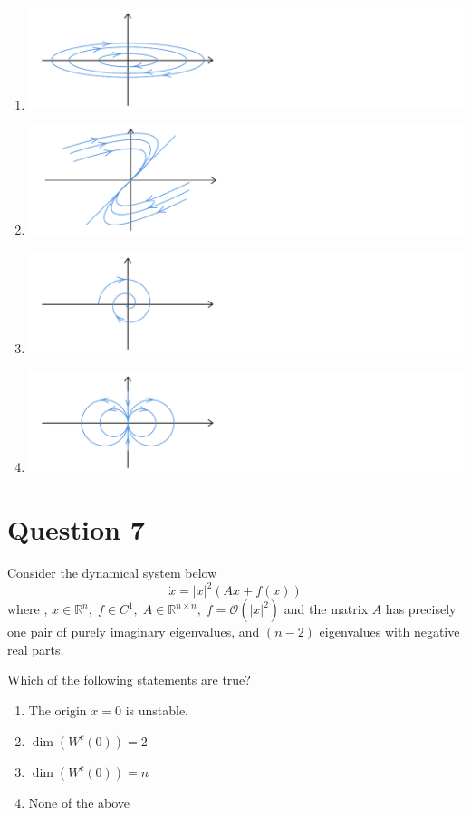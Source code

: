 \documentclass[twoside,10pt,a4paper]{article}
\begin{document}
\begin{enumerate}[label=(\alph*)]
	\item \includegraphics[scale=0.8]{Graphics/MCQ1_figures/Q17D01.pdf}
	\item \includegraphics[scale=0.8]{Graphics/MCQ1_figures/Q17D02.pdf}
	\item \includegraphics[scale=0.8]{Graphics/MCQ1_figures/Q17D03.pdf}
	\item \includegraphics[scale=0.8]{Graphics/MCQ1_figures/Q17D04.pdf}
\end{enumerate}

\section*{Question 7}
Consider the dynamical system below
\begin{equation*}
	\dot{x} = |x|^2 (Ax + f(x))
\end{equation*}
where , $x \in \mathbb{R}^n, \; f \in C^1, \; A \in \mathbb{R}^{n \times n}, \; f = \mathcal{O}(|x|^2)$ and the matrix $A$ has precisely one pair of purely imaginary eigenvalues, and $(n - 2)$ eigenvalues with negative real parts.

Which of the following statements are true?

\begin{enumerate}[label=(\alph*)]
	\item The origin $x = 0$ is unstable.
	\item $ \dim(W^c(0)) = 2 $
	\item$ \dim(W^c(0)) = n $
	\item None of the above
\end{enumerate}
\end{document}
